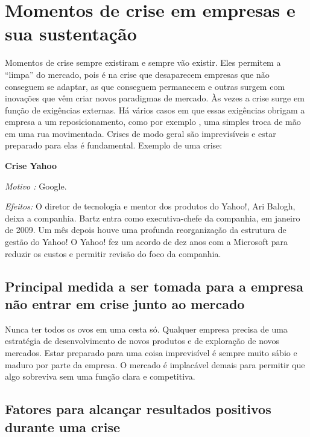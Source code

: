 \documentclass[11pt]{article}
\begin{document}
\section{Momentos de crise em empresas e sua sustentação}
Momentos de crise sempre existiram e sempre vão existir. Eles permitem a “limpa” do mercado, pois é na crise que desaparecem empresas que não conseguem se adaptar, as que conseguem permanecem e outras surgem com inovações que vêm criar novos paradigmas de mercado. Às vezes a crise surge em função de exigências externas. Há vários casos em que essas exigências obrigam a empresa a um reposicionamento, como por exemplo , uma simples troca de mão em uma rua movimentada. Crises de modo geral são imprevisíveis e estar preparado para elas é fundamental. 
Exemplo de uma crise:
 
\textbf{Crise Yahoo} 

\textit{Motivo :} Google.

\textit{Efeitos:} O diretor de tecnologia e mentor dos produtos do Yahoo!, Ari Balogh, deixa a companhia.  Bartz entra como executiva-chefe da companhia, em janeiro de 2009. Um mês depois houve uma profunda reorganização da estrutura de gestão do Yahoo! O Yahoo! fez um acordo de dez anos com a Microsoft para reduzir os custos e permitir revisão do foco da companhia.


\subsection{Principal medida a ser tomada para a empresa não entrar em crise junto ao mercado}

Nunca ter todos os ovos em uma cesta só. Qualquer empresa precisa de uma estratégia de desenvolvimento de novos produtos e de exploração de novos mercados. Estar preparado para uma coisa imprevisível é sempre muito sábio e maduro por parte da empresa. O mercado é implacável demais para permitir que algo sobreviva sem uma função clara e competitiva.

\subsection{Fatores para alcançar resultados positivos durante uma crise}
\end{document}
